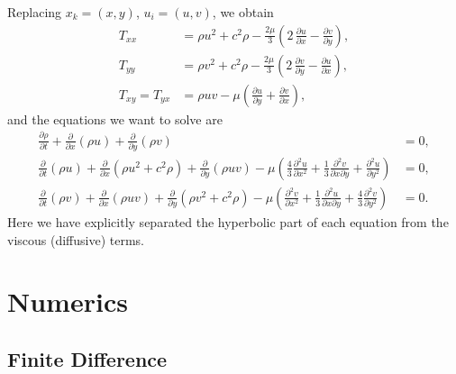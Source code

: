 \documentclass[11pt]{article}
\begin{document}
Replacing $x_k = (x,y)$, $u_i = (u, v)$, we obtain
\begin{align}
T_{xx} &= \rho u^2 + c^2\rho - \frac{2\mu}{3}\left( 2\,\frac{\partial u}{\partial x} - \frac{\partial v}{\partial y} \right),\\
T_{yy} &= \rho v^2 + c^2\rho - \frac{2\mu}{3}\left( 2\,\frac{\partial v}{\partial y} - \frac{\partial u}{\partial x} \right),\\
T_{xy} = T_{yx} &= \rho u v - \mu\left( \frac{\partial u}{\partial y} + \frac{\partial v}{\partial x} \right),
\end{align}
and the equations we want to solve are
\begin{align}
\frac{\partial\rho}{\partial t} + \frac{\partial}{\partial x}\left(\rho u\right) + \frac{\partial}{\partial y}\left(\rho v\right) &= 0,\\
\frac{\partial}{\partial t}\left(\rho u\right) + \frac{\partial}{\partial x}\left( \rho u^2 + c^2\rho \right) + \frac{\partial}{\partial y}\left( \rho u v \right) - \mu\left(\frac{4}{3}\frac{\partial^2u}{\partial x^2} + \frac{1}{3}\frac{\partial^2 v}{\partial x \partial y} + \frac{\partial^2u}{\partial y^2}\right) &= 0,\\
\frac{\partial}{\partial t}\left( \rho v\right) + \frac{\partial}{\partial x}\left( \rho uv \right) + \frac{\partial}{\partial y}\left( \rho v^2 + c^2\rho\right) - \mu\left( \frac{\partial^2 v}{\partial x^2} + \frac{1}{3}\frac{\partial^2u}{\partial x \partial y} +  \frac{4}{3}\frac{\partial^2 v}{\partial y^2} \right) &= 0.
\end{align}
Here we have explicitly separated the hyperbolic part of each equation from the viscous (diffusive) terms. 

\section{Numerics}

\subsection{Finite Difference}
\end{document}
